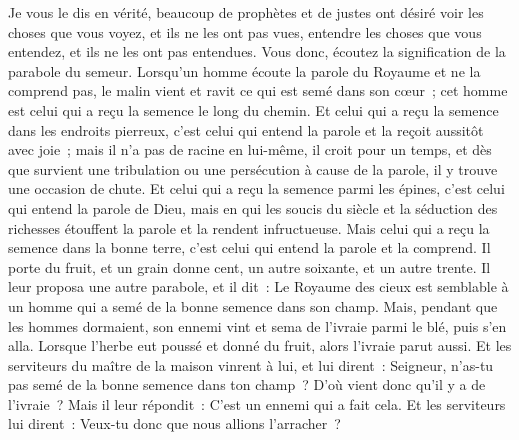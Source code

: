 \begin{multicols}{2}
Je vous le dis en vérité, beaucoup de prophètes et de justes ont désiré voir les choses que vous voyez, et ils ne les ont pas vues, entendre les choses que vous entendez, et ils ne les ont pas entendues.
Vous donc, écoutez la signification de la parabole du semeur.
Lorsqu'un homme écoute la parole du Royaume et ne la comprend pas, le malin vient et ravit ce qui est semé dans son cœur~; cet homme est celui qui a reçu la semence le long du chemin.
Et celui qui a reçu la semence dans les endroits pierreux, c'est celui qui entend la parole et la reçoit aussitôt avec joie~;
mais il n'a pas de racine en lui-même, il croit pour un temps, et dès que survient une tribulation ou une persécution à cause de la parole, il y trouve une occasion de chute.
Et celui qui a reçu la semence parmi les épines, c'est celui qui entend la parole de Dieu, mais en qui les soucis du siècle et la séduction des richesses étouffent la parole et la rendent infructueuse.
Mais celui qui a reçu la semence dans la bonne terre, c'est celui qui entend la parole et la comprend. Il porte du fruit, et un grain donne cent, un autre soixante, et un autre trente.
Il leur proposa une autre parabole, et il dit~: Le Royaume des cieux est semblable à un homme qui a semé de la bonne semence dans son champ.
Mais, pendant que les hommes dormaient, son ennemi vint et sema de l'ivraie parmi le blé, puis s'en alla.
Lorsque l'herbe eut poussé et donné du fruit, alors l'ivraie parut aussi.
Et les serviteurs du maître de la maison vinrent à lui, et lui dirent~: Seigneur, n'as-tu pas semé de la bonne semence dans ton champ~? D'où vient donc qu'il y a de l'ivraie~?
Mais il leur répondit~: C'est un ennemi qui a fait cela. Et les serviteurs lui dirent~: Veux-tu donc que nous allions l'arracher~?

\end{multicols}

